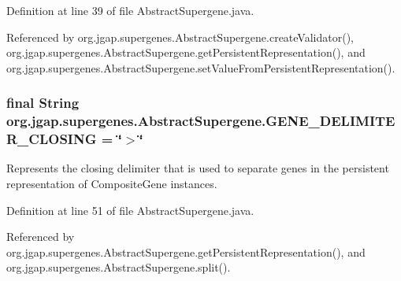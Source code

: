 Definition at line 39 of file Abstract\-Supergene.\-java.



Referenced by org.\-jgap.\-supergenes.\-Abstract\-Supergene.\-create\-Validator(), org.\-jgap.\-supergenes.\-Abstract\-Supergene.\-get\-Persistent\-Representation(), and org.\-jgap.\-supergenes.\-Abstract\-Supergene.\-set\-Value\-From\-Persistent\-Representation().

\hypertarget{classorg_1_1jgap_1_1supergenes_1_1_abstract_supergene_a96059d4ef9cca18130330f3ab782c28b}{
\subsubsection[{G\-E\-N\-E\-\_\-\-D\-E\-L\-I\-M\-I\-T\-E\-R\-\_\-\-C\-L\-O\-S\-I\-N\-G}]{\setlength{\rightskip}{0pt plus 5cm}final String org.\-jgap.\-supergenes.\-Abstract\-Supergene.\-G\-E\-N\-E\-\_\-\-D\-E\-L\-I\-M\-I\-T\-E\-R\-\_\-\-C\-L\-O\-S\-I\-N\-G = \char`\"{}$>$\char`\"{}\hspace{0.3cm}{\ttfamily [static]}}}\label{classorg_1_1jgap_1_1supergenes_1_1_abstract_supergene_a96059d4ef9cca18130330f3ab782c28b}
Represents the closing delimiter that is used to separate genes in the persistent representation of Composite\-Gene instances. 

Definition at line 51 of file Abstract\-Supergene.\-java.



Referenced by org.\-jgap.\-supergenes.\-Abstract\-Supergene.\-get\-Persistent\-Representation(), and org.\-jgap.\-supergenes.\-Abstract\-Supergene.\-split().

